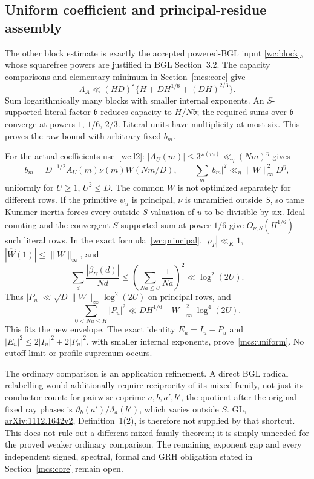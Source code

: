 \documentclass[11pt]{article}
\theoremstyle{definition}\newtheorem{definition}[theorem]{Definition}
\theoremstyle{remark}\newtheorem{remark}[theorem]{Remark}
\begin{document}
\subsection{Uniform coefficient and principal-residue assembly}
The other block estimate is exactly the accepted powered-BGL input
\eqref{wc:block}, whose squarefree powers are justified in BGL
Section~3.2. The capacity comparisons and elementary minimum in
Section~\ref{mcs:core} give
\[
 \Lambda_A\ll(HD)^\varepsilon
          \{H+DH^{1/6}+(DH)^{2/3}\}.
\]
Sum logarithmically many blocks with smaller internal exponents.
An $S$-supported literal factor $\mathfrak b$ reduces capacity to
$H/N\mathfrak b$; the required sums over $\mathfrak b$ converge
at powers $1$, $1/6$, $2/3$. Literal units have multiplicity at most six.
This proves the raw bound with arbitrary fixed $b_m$.

For the actual coefficients use~\eqref{wc:l2}:
$|A_U(m)|\le3^{\omega(m)}\ll_\eta(Nm)^\eta$ gives
\[
 b_m=D^{-1/2}A_U(m)\nu(m)W(Nm/D),\qquad
       \sum_m|b_m|^2\ll_\eta\|W\|_\infty^2D^\eta,
\]
uniformly for $U\ge1$, $U^2\le D$. The common $W$ is not optimized
separately for different rows. If the primitive $\psi_u$ is principal,
$\nu$ is unramified outside $S$, so tame Kummer inertia forces every
outside-$S$ valuation of $u$ to be divisible by six. Ideal counting and
the convergent $S$-supported sum at power $1/6$ give
$O_{\nu,S}(H^{1/6})$ such literal rows.
In the exact formula~\eqref{wc:principal}, $|\rho_T|\ll_K1$,
$|\widehat W(1)|\le\|W\|_\infty$, and
\[
 \sum_d\frac{|\beta_U(d)|}{Nd}
 \le\left(\sum_{Na\le U}\frac1{Na}\right)^2
 \ll\log^2(2U).
\]
Thus $|P_u|\ll\sqrt D\|W\|_\infty\log^2(2U)$ on principal rows,
and
\[
 \sum_{0<Nu\le H}|P_u|^2
       \ll DH^{1/6}\|W\|_\infty^2\log^4(2U).
\]
This fits the new envelope. The exact identity $E_u=I_u-P_u$ and
$|E_u|^2\le2|I_u|^2+2|P_u|^2$, with smaller internal exponents,
prove~\eqref{mcs:uniform}. No cutoff limit or profile supremum occurs.

The ordinary comparison is an application refinement. A direct BGL
radical relabelling would additionally require reciprocity of its mixed
family, not just its conductor count: for pairwise-coprime $a,b,a',b'$,
the quotient after the original fixed ray phases is
$\vartheta_b(a')/\vartheta_a(b')$, which varies outside $S$.
GL, \href{https://arxiv.org/pdf/1112.1642v2}{arXiv:1112.1642v2},
Definition~1(2), is therefore not supplied by that shortcut.
This does not rule out a different mixed-family theorem; it is simply
unneeded for the proved weaker ordinary comparison.
The remaining exponent gap and every independent signed, spectral,
formal and GRH obligation stated in Section~\ref{mcs:core} remain open.
\end{document}
